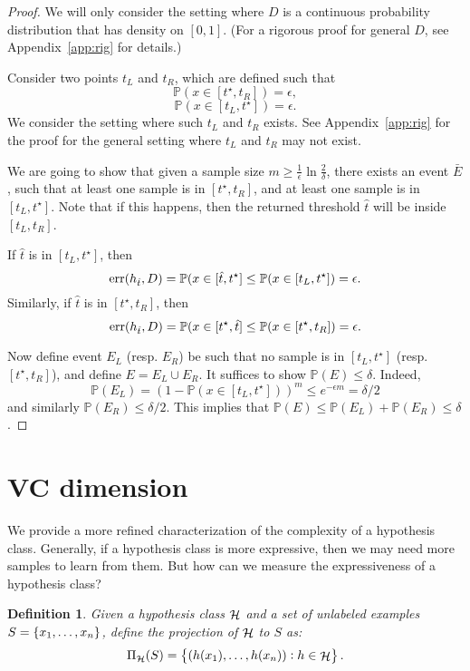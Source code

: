 \documentclass{article}
\newtheorem{definition}{Definition}
\DeclareMathOperator*{\err}{{\rm err}}
\DeclareMathOperator*{\Hcal}{{\cal H}}
\newcommand{\PP}{\mathbb{P}}
\begin{document}
\begin{proof}
We will only consider the setting where $D$ is a continuous probability distribution that has density on $[0,1]$. (For a rigorous proof for general $D$, see Appendix~\ref{app:rig} for details.)

Consider two points $t_L$ and $t_R$, which are defined such that
\[ \PP(x \in [t^\star, t_R]) = \epsilon, \]
\[ \PP(x \in [t_L, t^\star]) = \epsilon. \]
We consider the setting where such $t_L$ and $t_R$ exists. See Appendix~\ref{app:rig} for the proof for the general setting where $t_L$ and $t_R$ may not exist.

We are going to show that given a sample size $m \geq \frac{1}{\epsilon} \ln\frac{2}{\delta}$, there exists an event $\bar{E}$, such that at least one sample is in $[t^\star, t_R]$, and at least one sample is in $[t_L, t^\star]$. Note that if this happens, then the returned threshold $\hat{t}$ will be inside $[t_L, t_R]$.

If $\hat{t}$ is in $[t_L, t^\star]$, then
\[ \err(h_{\hat{t}}, D) = \PP(x \in [\hat{t}, t^\star] \leq \PP(x \in [t_L, t^\star]) = \epsilon. \]
Similarly, if $\hat{t}$ is in $[t^\star, t_R]$, then
\[ \err(h_{\hat{t}}, D) = \PP(x \in [t^\star, \hat{t}] \leq \PP(x \in [t^\star, t_R]) = \epsilon. \]

Now define event $E_L$ (resp. $E_R$) be such that no sample is in $[t_L, t^\star]$ (resp. $[t^\star, t_R]$), and define $E = E_L \cup E_R$. It suffices to show $\PP(E) \leq \delta$.
Indeed,
\[ \PP(E_L) = (1 - \PP(x \in [t_L, t^\star]))^m \leq e^{-\epsilon m} = \delta/2\]
and similarly $\PP(E_R) \leq \delta/2$. This implies that $\PP(E) \leq \PP(E_L) + \PP(E_R) \leq \delta$.
\end{proof}

\section{VC dimension}
We provide a more refined characterization of the complexity of a hypothesis class. Generally, if a hypothesis class is more expressive, then we may need more samples
to learn from them. But how can we measure the expressiveness of a hypothesis class?

\begin{definition}
Given a hypothesis class $\Hcal$ and a set of unlabeled examples $S = \cbr{x_1, \ldots, x_n}$, define the projection of $\Hcal$ to $S$ as:
\[ \Pi_{\Hcal}(S) = \cbr{(h(x_1), \ldots, h(x_n)): h \in \Hcal}. \]
\end{definition}
\end{document}
